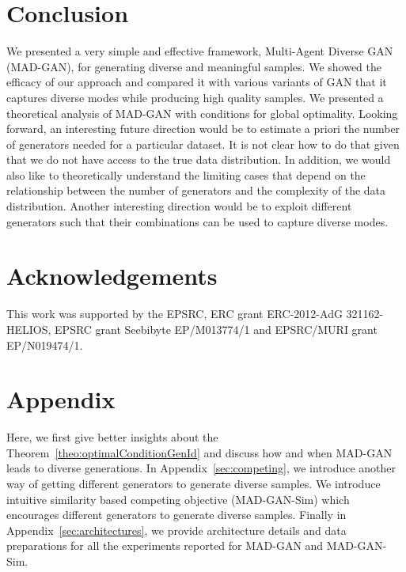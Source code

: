 \section{Conclusion}
We presented a very simple and effective framework, Multi-Agent Diverse GAN (MAD-GAN), for generating diverse and meaningful samples. We showed the efficacy of our approach and compared it with various variants of GAN that it captures diverse modes while producing high quality samples. We presented a theoretical analysis of MAD-GAN with conditions for global optimality. Looking forward, an interesting future direction would be to estimate a priori the number of generators needed for a particular dataset. It is not clear how to do that given that we do not have access to the true data distribution. In addition, we would also like to theoretically understand the limiting cases that depend on the relationship between the number of generators and the complexity of the data distribution. Another interesting direction would be to exploit different generators such that their combinations can be used to capture diverse modes. 

\section{Acknowledgements}
This work was supported by the EPSRC, ERC grant ERC-2012-AdG 321162-HELIOS, EPSRC grant Seebibyte EP/M013774/1 and EPSRC/MURI grant EP/N019474/1.

{\small
	
	
}

\newpage
\appendix

\section*{Appendix}
Here, we first give better insights about the Theorem~\ref{theo:optimalConditionGenId} and discuss how and when MAD-GAN leads to diverse generations. In Appendix~\ref{sec:competing}, we introduce another way of getting different generators to generate diverse samples. We introduce intuitive similarity based competing objective (MAD-GAN-Sim) which encourages different generators to generate diverse samples. Finally in Appendix~\ref{sec:architectures}, we provide architecture details and data preparations for all the experiments reported for MAD-GAN and MAD-GAN-Sim.

